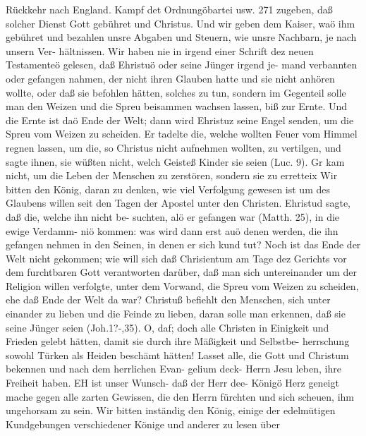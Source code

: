 Rückkehr nach England. Kampf det Ordnungöbartei usw. 271
zugeben, daß solcher Dienst Gott gebühret und Christus. Und
wir geben dem Kaiser, waö ihm gebühret und bezahlen unsre
Abgaben und Steuern, wie unsre Nachbarn, je nach unsern Ver-
hältnissen. Wir haben nie in irgend einer Schrift dez neuen
Testamenteö gelesen, daß Ehristuö oder seine Jünger irgend je-
mand verbannten oder gefangen nahmen, der nicht ihren Glauben
hatte und sie nicht anhören wollte, oder daß sie befohlen hätten,
solches zu tun, sondern im Gegenteil solle man den Weizen und
die Spreu beisammen wachsen lassen, biß zur Ernte. Und die
Ernte ist daö Ende der Welt; dann wird Ehristuz seine Engel
senden, um die Spreu vom Weizen zu scheiden. Er tadelte die,
welche wollten Feuer vom Himmel regnen lassen, um die, so
Christus nicht aufnehmen wollten, zu vertilgen, und sagte ihnen,
sie wüßten nicht, welch Geisteß Kinder sie seien (Luc. 9). Gr
kam nicht, um die Leben der Menschen zu zerstören, sondern sie
zu erretteix
Wir bitten den König, daran zu denken, wie viel Verfolgung
gewesen ist um des Glaubens willen seit den Tagen der Apostel
unter den Christen. Ehristud sagte, daß die, welche ihn nicht be-
suchten, alö er gefangen war (Matth. 25), in die ewige Verdamm-
niö kommen: was wird dann erst auö denen werden, die ihn
gefangen nehmen in den Seinen, in denen er sich kund tut?
Noch ist das Ende der Welt nicht gekommen; wie will sich daß
Chrisientum am Tage dez Gerichts vor dem furchtbaren Gott
verantworten darüber, daß man sich untereinander um der Religion
willen verfolgte, unter dem Vorwand, die Spreu vom Weizen zu
scheiden, ehe daß Ende der Welt da war? Christuß befiehlt
den Menschen, sich unter einander zu lieben und die Feinde zu
lieben, daran solle man erkennen, daß sie seine Jünger seien
(Joh.1?-,35). O, daf; doch alle Christen in Einigkeit und Frieden
gelebt hätten, damit sie durch ihre Mäßigkeit und Selbstbe-
herrschung sowohl Türken als Heiden beschämt hätten! Lasset alle,
die Gott und Christum bekennen und nach dem herrlichen Evan-
gelium deck- Herrn Jesu leben, ihre Freiheit haben. EH ist unser
Wunsch- daß der Herr dee- Königö Herz geneigt mache gegen
alle zarten Gewissen, die den Herrn fürchten und sich scheuen,
ihm ungehorsam zu sein.
Wir bitten inständig den König, einige der edelmütigen
Kundgebungen verschiedener Könige und anderer zu lesen über


